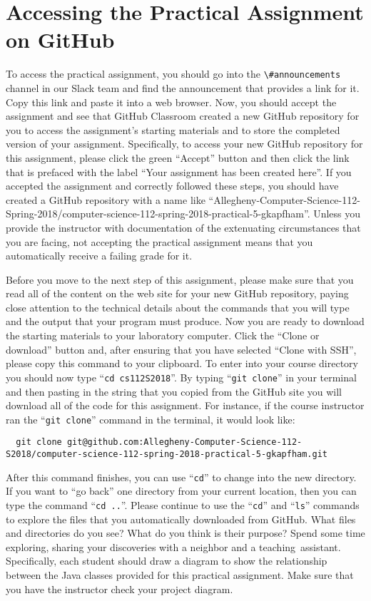 \documentclass[11pt]{article}
\newcommand{\command}[1]{``\lstinline{#1}''}
\newcommand{\channel}[1]{\lstinline{#1}}
\newcommand{\step}[1]{``{#1}''}
\begin{document}
\section*{Accessing the Practical Assignment on GitHub}

To access the practical assignment, you should go into the
\channel{\#announcements} channel in our Slack team and find the announcement
that provides a link for it. Copy this link and paste it into a web browser.
Now, you should accept the assignment and see that GitHub Classroom created a
new GitHub repository for you to access the assignment's starting materials and
to store the completed version of your assignment. Specifically, to access your
new GitHub repository for this assignment, please click the green ``Accept''
button and then click the link that is prefaced with the label ``Your assignment
has been created here''. If you accepted the assignment and correctly followed
these steps, you should have created a GitHub repository with a name like
``Allegheny-Computer-Science-112-Spring-2018/computer-science-112-spring-2018-practical-5-gkapfham''.
Unless you provide the instructor with documentation of the extenuating
circumstances that you are facing, not accepting the practical assignment means
that you automatically receive a failing grade for it.

Before you move to the next step of this assignment, please make sure that you
read all of the content on the web site for your new GitHub repository, paying
close attention to the technical details about the commands that you will type
and the output that your program must produce. Now you are ready to download the
starting materials to your laboratory computer. Click the ``Clone or download''
button and, after ensuring that you have selected ``Clone with SSH'', please
copy this command to your clipboard. To enter into your course directory you
should now type \command{cd cs112S2018}. By typing \command{git clone} in your
terminal and then pasting in the string that you copied from the GitHub site you
will download all of the code for this assignment. For instance, if the course
instructor ran the \command{git clone} command in the terminal, it would look
like:

\begin{lstlisting}
  git clone git@github.com:Allegheny-Computer-Science-112-S2018/computer-science-112-spring-2018-practical-5-gkapfham.git
\end{lstlisting}

After this command finishes, you can use \command{cd} to change into the new
directory. If you want to \step{go back} one directory from your current
location, then you can type the command \command{cd ..}. Please continue to use
the \command{cd} and \command{ls} commands to explore the files that you
automatically downloaded from GitHub. What files and directories do you see?
What do you think is their purpose? Spend some time exploring, sharing your
discoveries with a neighbor and a \mbox{teaching assistant}. Specifically, each
student should draw a diagram to show the relationship between the Java classes
provided for this practical assignment. Make sure that you have the instructor
check your project diagram.
\end{document}
